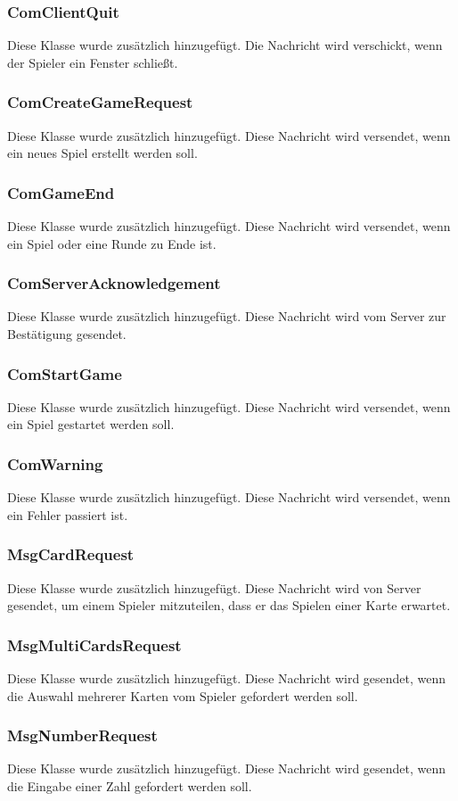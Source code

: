 \documentclass[twoside]{article}
\begin{document}
\subsubsection{ComClientQuit}
Diese Klasse wurde zusätzlich hinzugefügt. Die Nachricht wird verschickt, wenn der Spieler ein Fenster schließt.
\subsubsection{ComCreateGameRequest}
Diese Klasse wurde zusätzlich hinzugefügt. Diese Nachricht wird versendet, wenn ein neues Spiel erstellt werden soll.
\subsubsection{ComGameEnd}
Diese Klasse wurde zusätzlich hinzugefügt. Diese Nachricht wird versendet, wenn ein Spiel oder eine Runde zu Ende ist.
\subsubsection{ComServerAcknowledgement}
Diese Klasse wurde zusätzlich hinzugefügt. Diese Nachricht wird vom Server zur Bestätigung gesendet.
\subsubsection{ComStartGame}
Diese Klasse wurde zusätzlich hinzugefügt. Diese Nachricht wird versendet, wenn ein Spiel gestartet werden soll.
\subsubsection{ComWarning}
Diese Klasse wurde zusätzlich hinzugefügt. Diese Nachricht wird versendet, wenn ein Fehler passiert ist.
\subsubsection{MsgCardRequest}
Diese Klasse wurde zusätzlich hinzugefügt. Diese Nachricht wird von Server gesendet, um einem Spieler mitzuteilen, dass er das Spielen einer Karte erwartet.
\subsubsection{MsgMultiCardsRequest}
Diese Klasse wurde zusätzlich hinzugefügt.  Diese Nachricht wird gesendet, wenn die Auswahl mehrerer Karten vom Spieler gefordert werden soll.
\subsubsection{MsgNumberRequest}
Diese Klasse wurde zusätzlich hinzugefügt. Diese Nachricht wird gesendet, wenn die Eingabe einer Zahl gefordert werden soll.
\end{document}
